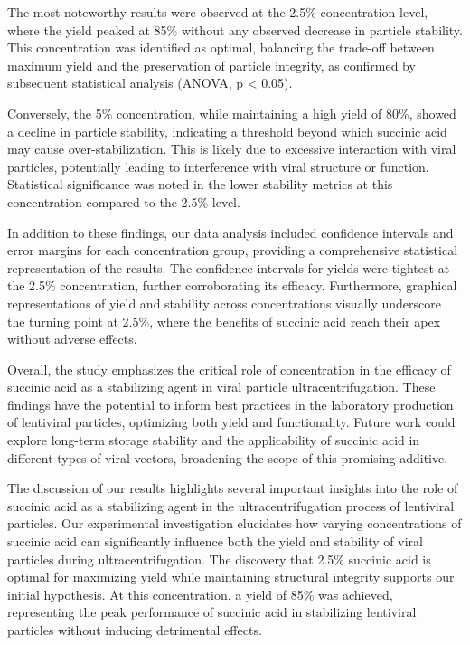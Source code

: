 \documentclass{article}
\begin{document}
The most noteworthy results were observed at the 2.5\% concentration level, where the yield peaked at 85\% without any observed decrease in particle stability. This concentration was identified as optimal, balancing the trade-off between maximum yield and the preservation of particle integrity, as confirmed by subsequent statistical analysis (ANOVA, p < 0.05).

Conversely, the 5\% concentration, while maintaining a high yield of 80\%, showed a decline in particle stability, indicating a threshold beyond which succinic acid may cause over-stabilization. This is likely due to excessive interaction with viral particles, potentially leading to interference with viral structure or function. Statistical significance was noted in the lower stability metrics at this concentration compared to the 2.5\% level.

In addition to these findings, our data analysis included confidence intervals and error margins for each concentration group, providing a comprehensive statistical representation of the results. The confidence intervals for yields were tightest at the 2.5\% concentration, further corroborating its efficacy. Furthermore, graphical representations of yield and stability across concentrations visually underscore the turning point at 2.5\%, where the benefits of succinic acid reach their apex without adverse effects.

Overall, the study emphasizes the critical role of concentration in the efficacy of succinic acid as a stabilizing agent in viral particle ultracentrifugation. These findings have the potential to inform best practices in the laboratory production of lentiviral particles, optimizing both yield and functionality. Future work could explore long-term storage stability and the applicability of succinic acid in different types of viral vectors, broadening the scope of this promising additive.

The discussion of our results highlights several important insights into the role of succinic acid as a stabilizing agent in the ultracentrifugation process of lentiviral particles. Our experimental investigation elucidates how varying concentrations of succinic acid can significantly influence both the yield and stability of viral particles during ultracentrifugation. The discovery that 2.5\% succinic acid is optimal for maximizing yield while maintaining structural integrity supports our initial hypothesis. At this concentration, a yield of 85\% was achieved, representing the peak performance of succinic acid in stabilizing lentiviral particles without inducing detrimental effects.
\end{document}
